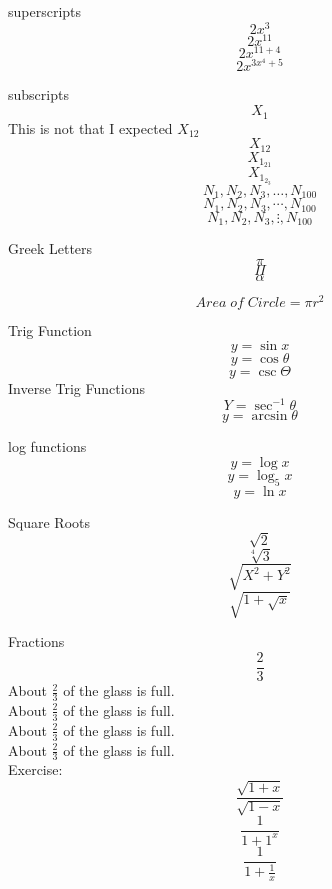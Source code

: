 \documentclass[11pt]{article}
\begin{document}
superscripts $$2x^3$$
$$2x^{11}$$
$$2x^{11+4}$$
$$2x^{3x^4+5}$$

subscripts $$X_1$$
This is not that I expected $X_12$
$$X_{12}$$
$$X_{1_{21}}$$
$$X_{1_{2_{3}}}$$
$$N_1,N_2,N_3,\ldots,N_{100}$$
$$N_1,N_2,N_3,\cdots,N_{100}$$
$$N_1,N_2,N_3,\vdots,N_{100}$$


Greek Letters
$$\pi$$
$$\Pi$$
$$\alpha$$


$$Area\; of\; Circle =\pi r^2$$

Trig Function
$$y=\sin x$$
$$y=\cos \theta$$
$$y=\csc \Theta$$
Inverse Trig Functions
$$Y=\sec ^{-1} \theta $$
$$y=\arcsin \theta$$

log functions
$$y=\log x$$
$$y=\log_5x$$
$$y=\ln x$$

Square Roots
$$\sqrt{2}$$
$$\sqrt[4]{3}$$
$$\sqrt{X^2+Y^2}$$
$$ \sqrt{1+ \sqrt{x}} $$

Fractions
$$\frac{2}{3}$$
About $\displaystyle \frac{2}{3}$ of the glass is full. \\ 
About $\frac{2}{3}$ of the glass is full.\\[6pt]
About $\displaystyle \frac{2}{3}$ of the glass is full. \\[6pt] 
About $\frac{2}{3}$ of the glass is full.\\[3pt]
Exercise:
$$\frac{\sqrt{1+x}}{\sqrt{1-x}}$$
$$\frac{1}{1+1^x}$$
$$\frac{1}{1+\frac{1}{x}}$$
\end{document}
